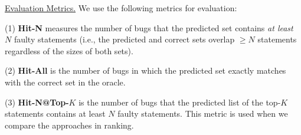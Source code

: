 \underline{Evaluation Metrics.}  
We use the following metrics for evaluation:

(1) {\bf Hit-N} measures the number of bugs that the predicted set
contains {\em at least} $N$ faulty statements (i.e., the predicted
and correct sets overlap $\geq$$N$ statements regardless of the sizes of both sets).

(2) {\bf Hit-All} is the number of bugs in which the predicted set exactly
matches with the correct set in the oracle.




(3) {\bf Hit-N@Top-$K$} is the number of bugs that the predicted list
of the top-$K$ statements contains at least $N$ faulty
statements. This metric is used when we compare the approaches in
ranking.







